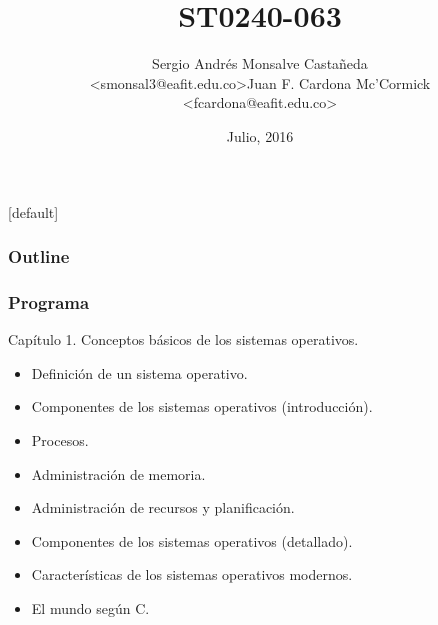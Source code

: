 \documentclass[xcolor=svgnames]{beamer}
\title[Programación de Computadores]{ST0240-063 }
\author{Sergio Andrés Monsalve Castañeda \\ \textless smonsal3@eafit.edu.co\textgreater \newline \newline Juan F. Cardona Mc'Cormick \\ \textless fcardona@eafit.edu.co\textgreater}
\institute{
  Departamento de Informática y Sistemas \\
  Universidad EAFIT, Medellin, Colombia\\\vspace{0.5cm}
  \scalebox{2}{\insertlogo}\\\vspace{1cm}
}
\date{Julio, 2016}
\makeatletter
\theoremstyle{example}
\newenvironment{withoutheadline}{
        \setbeamertemplate{headline}[default]
        \def\beamer@entrycode{\vspace*{-\headheight}}
    }{}
\makeatother
\begin{document}
	
\begin{frame}[plain]
	\titlepage
\end{frame}



\begin{withoutheadline}
  \begin{frame}
    \setcounter{tocdepth}{1}
    \frametitle{Outline}     
    \tableofcontents
  \end{frame}
\end{withoutheadline}

\begin{frame}
  \frametitle{Programa}
  \begin{block}{Capítulo 1. Conceptos básicos de los sistemas operativos.}
    \begin{itemize}%
    \item Definición de un sistema operativo.
    \item Componentes de los sistemas operativos (introducción).
    \item Procesos.
    \item Administración de memoria.
    \item Administración de recursos y planificación.
    \item Componentes de los sistemas operativos (detallado).
    \item Características de los sistemas operativos modernos.
    \item El mundo según C.
    \end{itemize}
  \end{block}
\end{frame}
\end{document}
